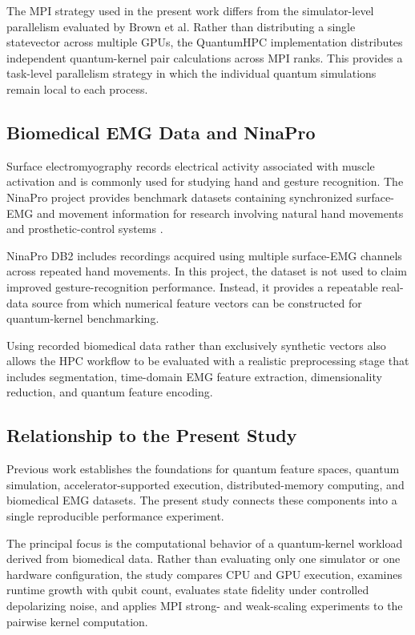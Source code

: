 \documentclass[pdflatex,sn-mathphys-num]{sn-jnl}%
\theoremstyle{thmstyleone}%
\theoremstyle{thmstyletwo}%
\theoremstyle{thmstylethree}%
\begin{document}
The MPI strategy used in the present work differs from the simulator-level
parallelism evaluated by Brown et al. Rather than distributing a single
statevector across multiple GPUs, the QuantumHPC implementation distributes
independent quantum-kernel pair calculations across MPI ranks. This provides a
task-level parallelism strategy in which the individual quantum simulations
remain local to each process.

\subsection{Biomedical EMG Data and NinaPro}
\label{subsec:related-ninapro}

Surface electromyography records electrical activity associated with muscle
activation and is commonly used for studying hand and gesture recognition.
The NinaPro project provides benchmark datasets containing synchronized
surface-EMG and movement information for research involving natural hand
movements and prosthetic-control systems \cite{atzori2014ninapro}.

NinaPro DB2 includes recordings acquired using multiple surface-EMG channels
across repeated hand movements. In this project, the dataset is not used to
claim improved gesture-recognition performance. Instead, it provides a
repeatable real-data source from which numerical feature vectors can be
constructed for quantum-kernel benchmarking.

Using recorded biomedical data rather than exclusively synthetic vectors also
allows the HPC workflow to be evaluated with a realistic preprocessing stage
that includes segmentation, time-domain EMG feature extraction, dimensionality
reduction, and quantum feature encoding.


\subsection{Relationship to the Present Study}
\label{subsec:related-gap}

Previous work establishes the foundations for quantum feature spaces, quantum
simulation, accelerator-supported execution, distributed-memory computing, and
biomedical EMG datasets. The present study connects these components into a
single reproducible performance experiment.

The principal focus is the computational behavior of a quantum-kernel workload
derived from biomedical data. Rather than evaluating only one simulator or one
hardware configuration, the study compares CPU and GPU execution, examines
runtime growth with qubit count, evaluates state fidelity under controlled
depolarizing noise, and applies MPI strong- and weak-scaling experiments to the
pairwise kernel computation.
\end{document}
